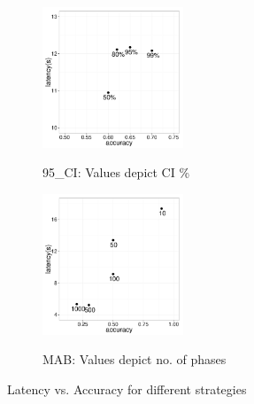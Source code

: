 \begin{figure}[h] 
\centering
\vspace{-10pt}
\begin{subfigure}{0.49\linewidth}
\centering
{\includegraphics[width=4.2cm] {Images/latency_vs_accuracy_ci.pdf}}
\caption{95\_CI: Values depict CI \%}
\label{fig:latency_vs_accuracy_ci}
\end{subfigure}
\begin{subfigure}{0.49\linewidth}
\centering
{\includegraphics[width=4.2cm] {Images/latency_vs_accuracy_mab.pdf}}
\caption{MAB: Values depict no. of phases}
\label{fig:latency_vs_accuracy_mab}
\end{subfigure}
\label{fig:accuracy}
\vspace{-10pt}
\caption{Latency vs. Accuracy for different strategies}
\vspace{-20pt}
\end{figure}








